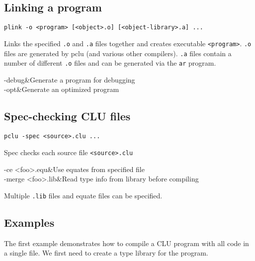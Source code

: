 \subsection{Linking a program}

\begin{syntax}
\verb+plink -o <program> [<object>.o] [<object-library>.a] ...+
\end{syntax}

\begin{overview}
Links the specified \verb|.o| and \verb|.a| files together and creates
executable \verb|<program>|.  \verb|.o| files are generated by pclu
(and various other compilers).  \verb|.a| files contain a number of
different \verb|.o| files and can be generated via the \verb|ar|
program.
\end{overview}

\begin{options}
-debug&Generate a program for debugging\\
-opt&Generate an optimized program\\
\end{options}

\subsection{Spec-checking CLU files}

\begin{syntax}
\verb|pclu -spec <source>.clu ...|
\end{syntax}

\begin{overview}
Spec checks each source file \verb|<source>.clu|
\end{overview}

\begin{options}
-ce <foo>.equ&Use equates from specified file\\
-merge <foo>.lib&Read type info from library before compiling\\
\end{options}

\begin{comments}
Multiple \verb|.lib| files and equate files can be specified.
\end{comments}

\subsection{Examples}

The first example demonstrates how to compile a CLU program with all
code in a single file. We first need to create a type library for the
program.

